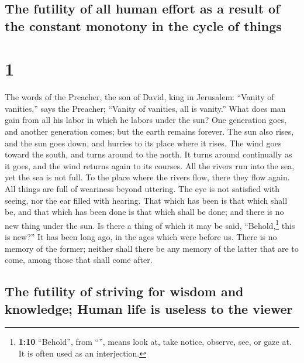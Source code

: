 \hypertarget{the-futility-of-all-human-effort-as-a-result-of-the-constant-monotony-in-the-cycle-of-things}{%
\subsection{The futility of all human effort as a result of the constant
monotony in the cycle of
things}\label{the-futility-of-all-human-effort-as-a-result-of-the-constant-monotony-in-the-cycle-of-things}}

\hypertarget{section}{%
\section{1}\label{section}}

 The words of the Preacher, the son of David, king in
Jerusalem:  ``Vanity of vanities,'' says the Preacher;
``Vanity of vanities, all is vanity.''  What does man gain
from all his labor in which he labors under the sun?  One
generation goes, and another generation comes; but the earth remains
forever.  The sun also rises, and the sun goes down, and
hurries to its place where it rises.  The wind goes toward
the south, and turns around to the north. It turns around continually as
it goes, and the wind returns again to its courses.  All
the rivers run into the sea, yet the sea is not full. To the place where
the rivers flow, there they flow again.  All things are
full of weariness beyond uttering. The eye is not satisfied with seeing,
nor the ear filled with hearing.  That which has been is
that which shall be, and that which has been done is that which shall be
done; and there is no new thing under the sun.  Is there
a thing of which it may be said, ``Behold,\footnote{\textbf{1:10}
  ``Behold'', from ``'', means look at, take notice,
  observe, see, or gaze at. It is often used as an interjection.} this
is new?'' It has been long ago, in the ages which were before us.
 There is no memory of the former; neither shall there be
any memory of the latter that are to come, among those that shall come
after.

\hypertarget{the-futility-of-striving-for-wisdom-and-knowledge-human-life-is-useless-to-the-viewer}{%
\subsection{The futility of striving for wisdom and knowledge; Human
life is useless to the
viewer}\label{the-futility-of-striving-for-wisdom-and-knowledge-human-life-is-useless-to-the-viewer}}

